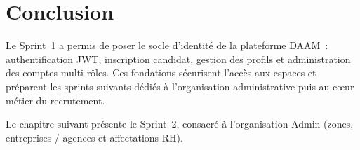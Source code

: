 \section{Conclusion}

Le Sprint~1 a permis de poser le socle d'identité de la plateforme DAAM~:
authentification JWT, inscription candidat, gestion des profils et
administration des comptes multi-rôles. Ces fondations sécurisent l'accès aux
espaces et préparent les sprints suivants dédiés à l'organisation
administrative puis au cœur métier du recrutement.

Le chapitre suivant présente le Sprint~2, consacré à l'organisation Admin
(zones, entreprises / agences et affectations RH).

\clearpage
